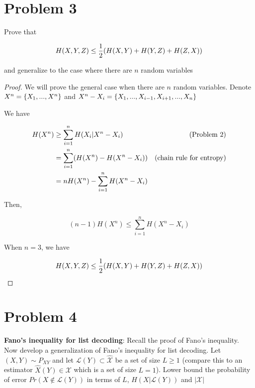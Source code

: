 \documentclass{article}
\begin{document}
\section{Problem 3}

Prove that 

$$
    H(X, Y, Z) \leq \frac{1}{2} \tuple*{H(X, Y) + H(Y, Z) + H(Z, X)}
$$

and generalize to the case where there are $n$ random variables

\begin{proof}
We will prove the general case when there are $n$ random variables. Denote $X^n = \{X_1, ..., X^n\}$ and $X^n - X_i = \{X_1, ..., X_{i-1}, X_{i+1}, ..., X_n\}$

We have

\begin{align*}
    H(X^n)
    &\geq \sum_{i=1}^n H(X_i | X^n - X_i) &\text{(Problem 2)}\\
    &= \sum_{i=1}^n \tuple*{H(X^n) - H(X^n - X_i)} &\text{(chain rule for entropy)}\\
    &= n H(X^n) - \sum_{i=1}^n H(X^n - X_i)
\end{align*}

Then,

$$
    (n-1) H(X^n) \leq \sum_{i=1}^n H(X^n - X_i)
$$

When $n=3$, we have

$$
    H(X, Y, Z) \leq \frac{1}{2} \tuple*{H(X, Y) + H(Y, Z) + H(Z, X)}
$$
\end{proof}

\section{Problem 4}

\textbf{Fano’s inequality for list decoding}: Recall the proof of Fano’s inequality. Now develop a generalization of Fano’s inequality for list decoding.
Let $(X, Y) \sim P_{XY}$ and let $\mathcal{L}(Y) \subset \hat{\mathcal{X}}$ be a set of size $L \geq 1$ (compare this to an estimator $\hat{X}(Y) \in \mathcal{X}$ which is a set of size $L=1$). Lower bound the probability of error $Pr(X \notin \mathcal{L}(Y))$ in terms of $L$, $H(X | \mathcal{L}(Y))$ and $|\mathcal{X}|$
\end{document}

